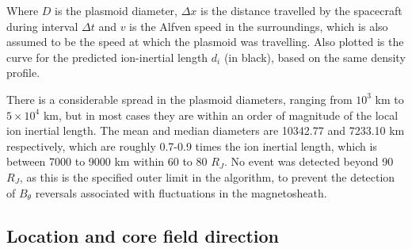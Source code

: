 Where $D$ is the plasmoid diameter, $\Delta x$ is the distance travelled by the spacecraft during interval $\Delta t$ and $v$ is the Alfven speed in the surroundings, which is also assumed to be the speed at which the plasmoid was travelling.  Also plotted is the curve for the predicted ion-inertial length $d_i$ (in black), based on the same density profile. 

There is a considerable spread in the plasmoid diameters, ranging from $10^3$ km to $5 \times 10^4$ km, but in most cases they are within an order of magnitude of the local ion inertial length. The mean and median diameters are 10342.77 and 7233.10 km respectively, which are roughly 0.7-0.9 times the ion inertial length, which is between 7000 to 9000 km within 60 to 80 $R_J$. No event was detected beyond 90 $R_J$, as this is the specified outer limit in the algorithm, to prevent the detection of $B_\theta$ reversals associated with fluctuations in the magnetosheath. 

\subsection{Location and core field direction}

